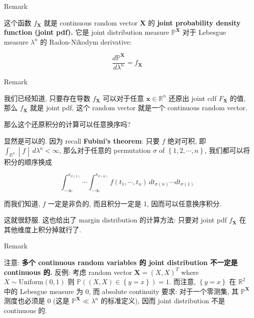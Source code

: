 \documentclass{qlnotes-export}
\begin{document}
\begin{qlremark}{Remark}

这个函数 \(f_{\mathbf{X}}\) 就是 continuous random vector \(\mathbf{X}\) 的 \textbf{joint probability density function (joint pdf).} 它是 joint distribution measure \({\mathbb{P}}^{\mathbf{X}}\) 对于 Lebesgue measure \(\lambda^{n}\) 的 Radon-Nikodym derivative:

\[\frac{d{\mathbb{P}}^{\mathbf{X}}}{d\lambda^{n}} = f_{\mathbf{X}}\]

\end{qlremark}

\begin{qlremark}{Remark}

我们已经知道, 只要存在导数 \(f_{\mathbf{X}}\) 可以对于任意 \(\mathbf{x} \in {\mathbb{R}}^{n}\) 还原出 joint cdf \(F_{\mathbf{X}}\) 的值, 那么 \(f_{\mathbf{X}}\) 就是 joint pdf, 这个 random vector 就是一个 continuous random vector.

那么这个还原积分的计算可以任意换序吗?

显然是可以的. 因为 recall \textbf{Fubini's theorem}: 只要 \(f\) 绝对可积, 即 \(\left. \int_{{\mathbb{R}}^{n}} \middle| f \middle| \, d\lambda^{n} < \infty \right.\), 那么对于任意的 permutation \(\sigma\) of \(\left\{ {1,2,\cdots,n} \right\}\), 我们都可以将积分的顺序换成

\[\int_{- \infty}^{x_{\sigma(1)}}\cdots\int_{- \infty}^{x_{\sigma(n)}}f(t_{1},\cdots,t_{n})\, dt_{\sigma(n)}\cdots dt_{\sigma(1)}\]

而我们知道, \(f\) 一定是非负的, 而且积分一定是 1, 因而可以任意换序积分.

这就很舒服. 这也给出了 margin distribution 的计算方法: 只要对 joint pdf \(f_{\mathbf{X}}\) 在其他维度上积分掉就行了.

\end{qlremark}

\begin{qlremark}{Remark}

注意: \textbf{多个 continuous random variables 的 joint distribution 不一定是 continuous 的.} 反例: 考虑 random vector \(\mathbf{X} = (X,X)^{T}\) where \(X \sim \text{Uniform}(0,1)\) 则 \({\mathbb{P}}((X,X) \in \left\{ {y = x} \right\}) = 1\). 而注意, \(\left\{ {y = x} \right\}\) 在 \({\mathbb{R}}^{2}\) 中的 Lebesgue measure 为 0, 而 absolute continuity 要求: 对于一个零测集, 其 \({\mathbb{P}}^{\mathbf{X}}\) 测度也必须是 0 (这是 \({\mathbb{P}}^{\mathbf{X}} \ll \lambda^{n}\) 的标准定义), 因而 joint distribution 不是 continuous 的.

\end{qlremark}
\end{document}
